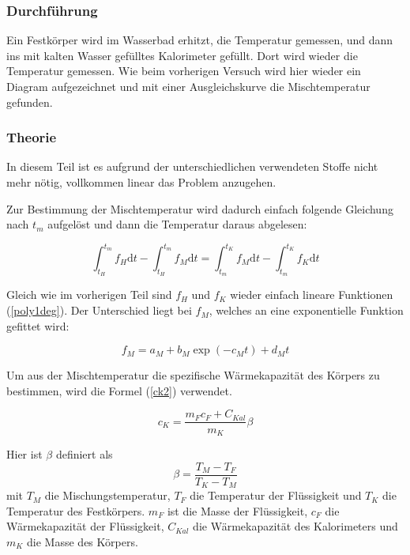 \documentclass[11pt,a4paper]{article}
\begin{document}
\subsubsection{Durchf\"uhrung}

Ein Festk\"orper wird im Wasserbad erhitzt, die Temperatur gemessen, und dann ins mit kalten Wasser gef\"ulltes Kalorimeter gef\"ullt. Dort wird wieder die Temperatur gemessen. Wie beim vorherigen Versuch wird hier wieder ein Diagram aufgezeichnet und mit einer Ausgleichskurve die Mischtemperatur gefunden. 

\subsubsection{Theorie}

In diesem Teil ist es aufgrund der unterschiedlichen verwendeten Stoffe nicht mehr n\"otig, vollkommen linear das Problem anzugehen.

Zur Bestimmung der Mischtemperatur wird dadurch einfach folgende Gleichung nach $t_m$ aufgel\"ost und dann die Temperatur daraus abgelesen:

\begin{equation}
\int_{t_H}^{t_m}f_H\mathrm{d}t-\int_{t_H}^{t_m}f_M\mathrm{d}t=\int_{t_m}^{t_K}f_M\mathrm{d}t-\int_{t_m}^{t_K}f_K\mathrm{d}t\label{bigint2}
\end{equation}

Gleich wie im vorherigen Teil sind $f_H$ und $f_K$ wieder einfach lineare Funktionen (\ref{poly1deg}). Der Unterschied liegt bei $f_M$, welches an eine exponentielle Funktion gefittet wird:

\begin{equation}
f_M=a_M+b_M\exp({-c_Mt})+d_Mt\label{efunc1}
\end{equation}

Um aus der Mischtemperatur die spezifische W\"armekapazit\"at des K\"orpers zu bestimmen, wird die Formel (\ref{ck2}) verwendet.

\begin{equation}
c_K=\frac{m_Fc_F+C_{Kal}}{m_K}\beta\label{ck2}
\end{equation}

Hier ist $\beta$ definiert als
\[
\beta=\frac{T_M-T_F}{T_K-T_M}
\]
mit $T_M$ die Mischungstemperatur, $T_F$ die Temperatur der Fl\"ussigkeit und $T_K$ die Temperatur des Festk\"orpers. $m_F$ ist die Masse der Fl\"ussigkeit, $c_F$ die W\"armekapazit\"at der Fl\"ussigkeit, $C_{Kal}$ die W\"armekapazit\"at des Kalorimeters und $m_K$ die Masse des K\"orpers.
\end{document}
